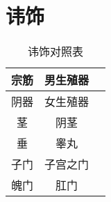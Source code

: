 
\section{讳饰}
\begin{table}[H]
  \centering
  \caption[]{讳饰对照表}
  \begin{tabular}{|c|c|c|}
    \hline 宗筋 & 男生殖器 \\
    \hline 阴器 & 女生殖器 \\
    \hline 茎 & 阴茎 \\
    \hline 垂 & 睾丸 \\
    \hline 子门 & 子宫之门 \\
    \hline 魄门 & 肛门 \\
    \hline
  \end{tabular}
\end{table}
